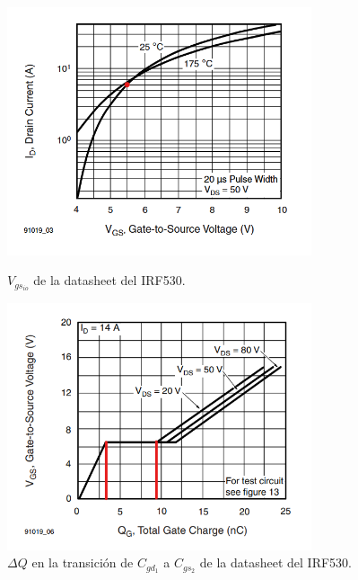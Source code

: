 \begin{figure}[H]
	\centering
	\begin{minipage}{0.45\textwidth}
		\centering
		\includegraphics[width=0.8\textwidth]{ImagenesEjercicio-1/Vgs-Id_LI} %
		\caption{$V_{gs_{io}}$ de la datasheet del IRF530.}
		\label{ej1:fig:vgsio}
	\end{minipage}\hfill
	\begin{minipage}{0.45\textwidth}
		\centering
		\includegraphics[width=0.8\textwidth]{ImagenesEjercicio-1/deltaq} %
		\caption{$\Delta Q$ en la transición de $C_{gd_1}$ a $C_{gs_2}$ de la datasheet del IRF530.}
		\label{ej1:fig:deltaq}
	\end{minipage}\hfill
\end{figure}
